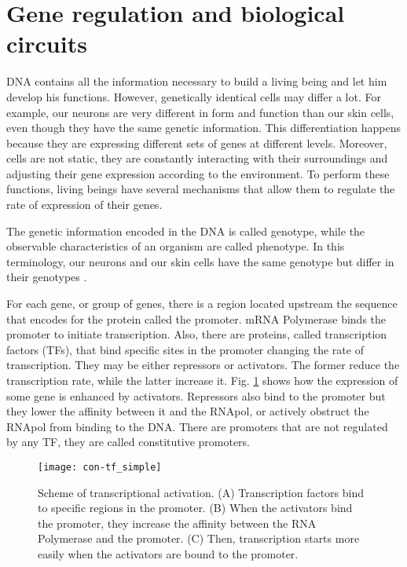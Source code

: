 \section{Gene regulation and biological circuits}

DNA contains all the information necessary to build a living being and let him develop his functions. However, genetically identical cells may differ a lot. For example, our neurons are very different in form and function than our skin cells, even though they have the same genetic information. This differentiation happens because they are expressing different sets of genes at different levels. Moreover, cells are not static, they are constantly interacting with their surroundings and adjusting their gene expression according to the environment. To perform these functions, living beings have several mechanisms that allow them to regulate the rate of expression of their genes.

The genetic information encoded in the DNA is called genotype, while the observable characteristics of an organism are called phenotype. In this terminology, our neurons and our skin cells have the same genotype but differ in their genotypes \cite{alberts13} \cite{alon06}.

For each gene, or group of genes, there is a region located upstream the sequence that encodes for the protein called the promoter. mRNA Polymerase binds the promoter to initiate transcription. Also, there are proteins, called transcription factors (TFs), that bind specific sites in the promoter changing the rate of transcription. They may be either repressors or activators. The former reduce the transcription rate, while the latter increase it. Fig. \ref{fig:con-tf_simple} shows how the expression of some gene is enhanced by activators. Repressors also bind to the promoter but they lower the affinity between it and the RNApol, or actively obstruct the RNApol from binding to the DNA. There are promoters that are not regulated by any TF, they are called constitutive promoters.

\begin{figure}[H]
  \centering
  \texttt{[image: con-tf\_simple]}
  \caption[Scheme of transcriptional activation]{\label{fig:con-tf_simple} Scheme of transcriptional activation. (A) Transcription factors bind to specific regions in the promoter. (B) When the activators bind the promoter, they increase the affinity between the RNA Polymerase and the promoter. (C) Then, transcription starts more easily when the activators are bound to the promoter.}
\end{figure}



